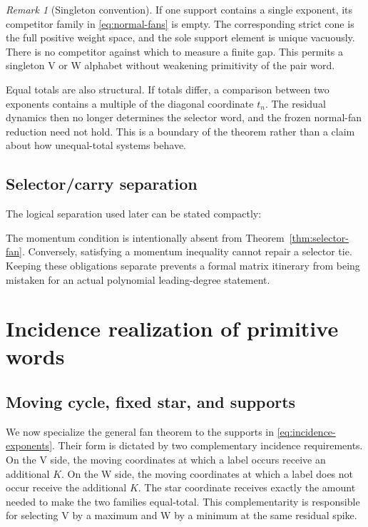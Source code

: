 \documentclass[11pt,letterpaper]{article}
\theoremstyle{definition}
\theoremstyle{remark}
\newtheorem{remark}[theorem]{Remark}
\numberwithin{equation}{section}
\begin{document}
\begin{remark}[Singleton convention]
\label{rem:singleton}
If one support contains a single exponent, its competitor family in
\eqref{eq:normal-fans} is empty.  The corresponding strict cone is the full
positive weight space, and the sole support element is unique vacuously.
There is no competitor against which to measure a finite gap.  This permits
a singleton V or W alphabet without weakening primitivity of the pair word.
\end{remark}

Equal totals are also structural.  If totals differ, a comparison between
two exponents contains a multiple of the diagonal coordinate \(t_n\).  The
residual dynamics then no longer determines the selector word, and the
frozen normal-fan reduction need not hold.  This is a boundary of the
theorem rather than a claim about how unequal-total systems behave.

\subsection{Selector/carry separation}

The logical separation used later can be stated compactly:

\noindent{}

The momentum condition is intentionally absent from
Theorem~\ref{thm:selector-fan}.  Conversely, satisfying a momentum
inequality cannot repair a selector tie.  Keeping these obligations separate
prevents a formal matrix itinerary from being mistaken for an actual
polynomial leading-degree statement.

\section{Incidence realization of primitive words}

\subsection{Moving cycle, fixed star, and supports}

We now specialize the general fan theorem to the supports in
\eqref{eq:incidence-exponents}.  Their form is dictated by two complementary
incidence requirements.  On the V side, the moving coordinates at which a
label occurs receive an additional \(K\).  On the W side, the moving
coordinates at which a label does not occur receive the additional \(K\).
The star coordinate receives exactly the amount needed to make the two
families equal-total.  This complementarity is responsible for selecting V
by a maximum and W by a minimum at the same residual spike.
\end{document}
